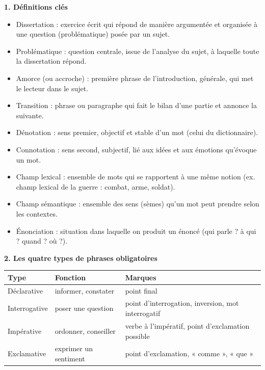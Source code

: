 \documentclass[11pt]{article}
\newcommand{\cle}[1]{{\popxbold\color{popdark}#1}}
\begin{document}
\begin{bilan}
\textbf{1. Définitions clés}
\begin{itemize}
  \item \cle{Dissertation} : exercice écrit qui répond de manière argumentée et organisée à une question (problématique) posée par un sujet.
  \item \cle{Problématique} : question centrale, issue de l'analyse du sujet, à laquelle toute la dissertation répond.
  \item \cle{Amorce} (ou accroche) : première phrase de l'introduction, générale, qui met le lecteur dans le sujet.
  \item \cle{Transition} : phrase ou paragraphe qui fait le bilan d'une partie et annonce la suivante.
  \item \cle{Dénotation} : sens premier, objectif et stable d'un mot (celui du dictionnaire).
  \item \cle{Connotation} : sens second, subjectif, lié aux idées et aux émotions qu'évoque un mot.
  \item \cle{Champ lexical} : ensemble de mots qui se rapportent à une même notion (ex. champ lexical de la guerre : combat, arme, soldat).
  \item \cle{Champ sémantique} : ensemble des sens (sèmes) qu'un mot peut prendre selon les contextes.
  \item \cle{Énonciation} : situation dans laquelle on produit un énoncé (qui parle ? à qui ? quand ? où ?).
\end{itemize}

\textbf{2. Les quatre types de phrases obligatoires}
\begin{center}
\begin{tabularx}{\linewidth}{|l|X|X|}
\hline
\rowcolor{popblueL} \textbf{Type} & \textbf{Fonction} & \textbf{Marques} \\
\hline
Déclarative & informer, constater & point final \\
\hline
Interrogative & poser une question & point d'interrogation, inversion, mot interrogatif \\
\hline
Impérative & ordonner, conseiller & verbe à l'impératif, point d'exclamation possible \\
\hline
Exclamative & exprimer un sentiment & point d'exclamation, « comme », « que » \\
\hline
\end{tabularx}
\end{center}


\end{bilan}
\end{document}
